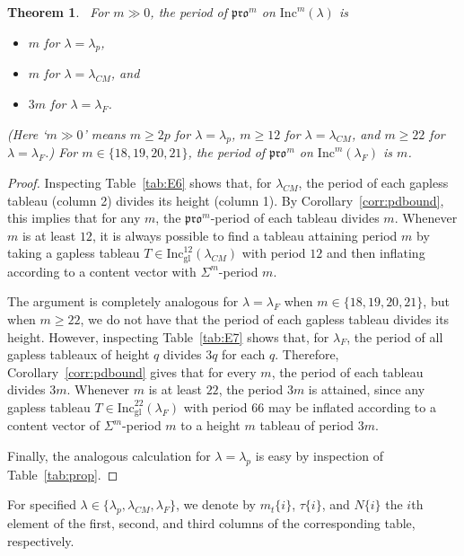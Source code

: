 \documentclass[12pt]{amsart}
\newtheorem{theorem}{Theorem}[section]
\theoremstyle{definition}
\theoremstyle{remark}
\numberwithin{equation}{section}
\newcommand{\inc}{\ensuremath{\mathrm{Inc}}}
\newcommand{\incgl}{\inc_{\mathrm{gl}}}
\newcommand{\pro}{\mathfrak{pro}}
\begin{document}
\begin{theorem}~\label{thm:actualpdbound}
For $m \gg 0$, the period of $\pro^m$ on $\inc^m(\lambda)$ is 
\begin{itemize}
\item $m$ for $\lambda = \lambda_p$, 
\item $m$ for $\lambda = \lambda_{CM}$, and 
\item $3m$ for $\lambda = \lambda_F$. 
\end{itemize}
(Here `$m \gg 0$' means $m \geq 2p$ for $\lambda = \lambda_p$, $m \geq 12$ for $\lambda = \lambda_{CM}$, and $m \geq 22$ for $\lambda = \lambda_F$.) For $m \in \lbrace 18,19,20, 21 \rbrace$, the period of $\pro^m$ on $\inc^m(\lambda_F)$ is $m$.
\end{theorem}
\begin{proof}
Inspecting Table~\ref{tab:E6} shows that, for $\lambda_{CM}$, the period of each gapless tableau (column 2) divides its height (column 1). By Corollary~\ref{corr:pdbound}, this implies that for any $m$, the $\pro^m$-period of each tableau divides $m$.
Whenever $m$ is at least $12$,  
it is always possible to find a tableau attaining period $m$ by taking a gapless tableau $T \in \incgl^{12}(\lambda_{CM})$ with period $12$ and then inflating according to a content vector with $\Sigma^m$-period $m$.

The argument is completely analogous for $\lambda = \lambda_F$ when $m \in \lbrace 18,19,20, 21 \rbrace$, but when $m \geq 22$, we do not have that the period of each gapless tableau divides its height. However, inspecting Table~\ref{tab:E7} shows that, for $\lambda_F$, the period of all gapless tableaux of height $q$ divides $3q$ for each $q$. Therefore, Corollary~\ref{corr:pdbound} gives that for every $m$, the period of each tableau divides $3m$. Whenever $m$ is at least $22$, the period $3m$ is attained, since any gapless tableau  $T \in \incgl^{22}(\lambda_F)$ with period $66$ may be inflated according to a content vector of $\Sigma^m$-period $m$ to a height $m$ tableau of period $3m$. 

Finally, the analogous calculation for $\lambda = \lambda_p$ is easy by inspection of Table~\ref{tab:prop}.
\end{proof}


For specified $\lambda \in \{\lambda_p, \lambda_{CM}, \lambda_F\}$, we denote by $m_t\{i\}$, $\tau\{i\}$, and $N\{i\}$ the $i$th element of the first, second, and third columns of the corresponding table, respectively. 
\-\ \\ \-\
\end{document}
